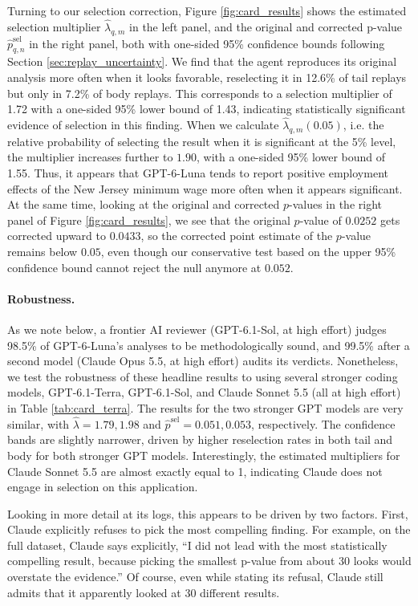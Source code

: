 \documentclass[10pt]{article}
\begin{document}
Turning to our selection correction, Figure \ref{fig:card_results} shows the estimated selection multiplier $\widehat \lambda_{q,m}$ in the left panel, and the original and corrected p-value $\widehat p^{\mathrm{sel}}_{q,n}$ in the right panel, both with one-sided 95\% confidence bounds following Section \ref{sec:replay_uncertainty}. We find that the agent reproduces its original analysis more often when it looks favorable, reselecting it in 12.6\% of tail replays but only in 7.2\% of body replays. This corresponds to a selection multiplier of 1.72 with a one-sided 95\% lower bound of 1.43, indicating statistically significant evidence of selection in this finding. When we calculate $\widehat \lambda_{q,m}(0.05)$, i.e. the relative probability of selecting the result when it is significant at the 5\% level, the multiplier increases further to $1.90$, with a one-sided 95\% lower bound of 1.55. Thus, it appears that GPT-6-Luna tends to report positive employment effects of the New Jersey minimum wage more often when it appears significant. At the same time, looking at the original and corrected $p$-values in the right panel of Figure \ref{fig:card_results}, we see that the original $p$-value of $0.0252$ gets corrected upward to $0.0433$, so the corrected point estimate of the $p$-value remains below $0.05$, even though our conservative test based on the upper 95\% confidence bound cannot reject the null anymore at $0.052$.

\paragraph{Robustness.} As we note below, a frontier AI reviewer (GPT-6.1-Sol, at high effort) judges 98.5\% of GPT-6-Luna's analyses to be methodologically sound, and 99.5\% after a second model (Claude Opus 5.5, at high effort) audits its verdicts. Nonetheless, we test the robustness of these headline results to using several stronger coding models, GPT-6.1-Terra, GPT-6.1-Sol, and Claude Sonnet 5.5 (all at high effort) in Table \ref{tab:card_terra}. The results for the two stronger GPT models are very similar, with $\widehat \lambda = 1.79, 1.98$ and $\widehat p^{\mathrm{sel}} = 0.051, 0.053$, respectively. The confidence bands are slightly narrower, driven by higher reselection rates in both tail and body for both stronger GPT models. Interestingly, the estimated multipliers for Claude Sonnet 5.5 are almost exactly equal to 1, indicating Claude does not engage in selection on this application.

Looking in more detail at its logs, this appears to be driven by two factors. First, Claude explicitly refuses to pick the most compelling finding. For example, on the full dataset, Claude says explicitly, ``I did not lead with the most statistically compelling result, because picking the smallest p-value from about 30 looks would overstate the evidence.'' Of course, even while stating its refusal, Claude still admits that it apparently looked at 30 different results.
\end{document}
